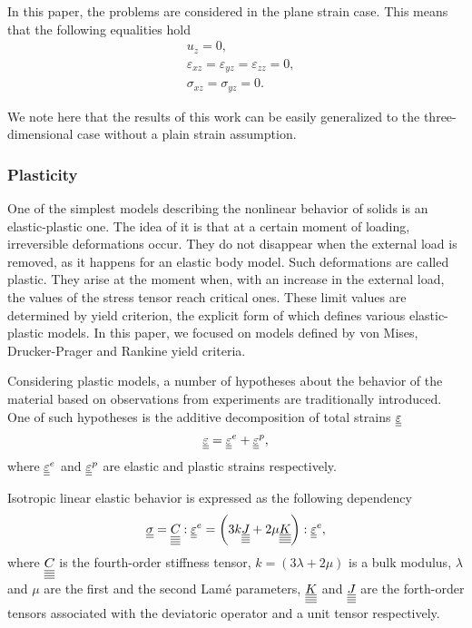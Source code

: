 \documentclass[12pt]{article}
\begin{document}
In this paper, the problems are considered in the plane strain case. This means that the following equalities hold
\begin{align}
    & u_z = 0, \\
    & \varepsilon_{xz} = \varepsilon_{yz} = \varepsilon_{zz} = 0, \\
    & \sigma_{xz} = \sigma_{yz} = 0.
\end{align}

We note here that the results of this work can be easily generalized to the three-dimensional case without a plain strain assumption.

\subsubsection{Plasticity}

One of the simplest models describing the nonlinear behavior of solids is an elastic-plastic one. The idea of it is that at a certain moment of loading, irreversible deformations occur. They do not disappear when the external load is removed, as it happens for an elastic body model. Such deformations are called plastic. They arise at the moment when, with an increase in the external load, the values of the stress tensor reach critical ones. These limit values are determined by yield criterion, the explicit form of which defines various elastic-plastic models. In this paper, we focused on models defined by von Mises, Drucker-Prager and Rankine yield criteria. 

Considering plastic models, a number of hypotheses about the behavior of the material based on observations from experiments are traditionally introduced. One of such hypotheses is the additive decomposition of total strains $\underline{\underline{\varepsilon}}$
\begin{equation}\label{eqn:eps_dec}
    \underline{\underline{\varepsilon}} = \underline{\underline{\varepsilon}}^e + \underline{\underline{\varepsilon}}^p,
\end{equation}
where $\underline{\underline{\varepsilon}}^e$ and $\underline{\underline{\varepsilon}}^p$ are elastic and plastic strains respectively.

Isotropic linear elastic behavior is expressed as the following dependency
\begin{equation}
    \underline{\underline{\sigma}} = \underline{\underline{\underline{\underline{C_{}}}}} : \underline{\underline{\varepsilon}}^e = \left( 3k\underline{\underline{\underline{\underline{J}}}} + 2\mu\underline{\underline{\underline{\underline{K}}}} \right) : \underline{\underline{\varepsilon}}^e,
\end{equation}
where $\underline{\underline{\underline{\underline{C_{}}}}}$ is the fourth-order stiffness tensor, $k = (3\lambda + 2\mu)$ is a bulk modulus, $\lambda$ and $\mu$ are the first and the second Lamé parameters, $\underline{\underline{\underline{\underline{K}}}}$ and $\underline{\underline{\underline{\underline{J}}}}$ are the forth-order tensors associated with the deviatoric operator and a unit tensor respectively.
\end{document}
